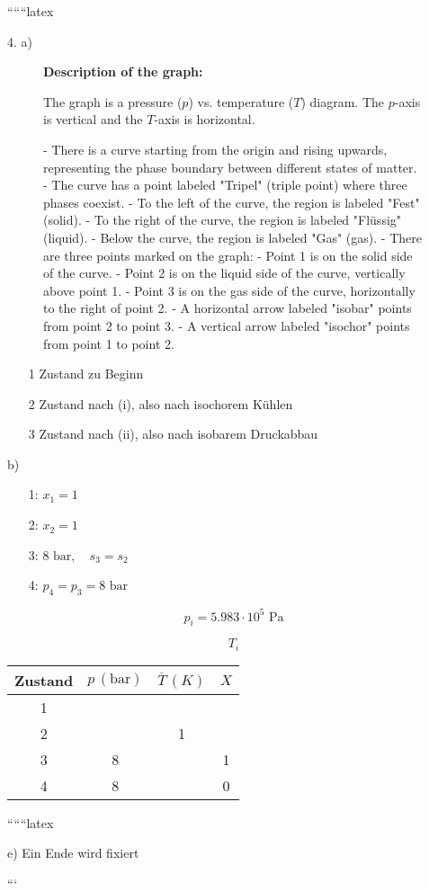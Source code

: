 
``````latex


4. a)

\begin{figure}[h!]
\centering
\begin{minipage}{0.8\textwidth}
\textbf{Description of the graph:}

The graph is a pressure ($p$) vs. temperature ($T$) diagram. The $p$-axis is vertical and the $T$-axis is horizontal. 

- There is a curve starting from the origin and rising upwards, representing the phase boundary between different states of matter.
- The curve has a point labeled "Tripel" (triple point) where three phases coexist.
- To the left of the curve, the region is labeled "Fest" (solid).
- To the right of the curve, the region is labeled "Flüssig" (liquid).
- Below the curve, the region is labeled "Gas" (gas).
- There are three points marked on the graph:
  - Point 1 is on the solid side of the curve.
  - Point 2 is on the liquid side of the curve, vertically above point 1.
  - Point 3 is on the gas side of the curve, horizontally to the right of point 2.
- A horizontal arrow labeled "isobar" points from point 2 to point 3.
- A vertical arrow labeled "isochor" points from point 1 to point 2.

\end{minipage}
\end{figure}

\begin{itemize}
    \item[1] Zustand zu Beginn
    \item[2] Zustand nach (i), also nach isochorem Kühlen
    \item[3] Zustand nach (ii), also nach isobarem Druckabbau
\end{itemize}

b)

\begin{itemize}
    \item[1:] $x_1 = 1$
    \item[2:] $x_2 = 1$
    \item[3:] $8 \text{ bar}, \quad s_3 = s_2$
    \item[4:] $p_4 = p_3 = 8 \text{ bar}$
\end{itemize}

\[
p_i = 5.983 \cdot 10^5 \text{ Pa}
\]

\[
T_i
\]

\begin{tabular}{|c|c|c|c|}
\hline
Zustand & $p \, (\text{bar})$ & $\overline{T} \, (K)$ & $X$ \\
\hline
1 & & & \\
\hline
2 & & 1 & \\
\hline
3 & 8 & & 1 \\
\hline
4 & 8 & & 0 \\
\hline
\end{tabular}

``````latex


e) Ein Ende wird fixiert

```